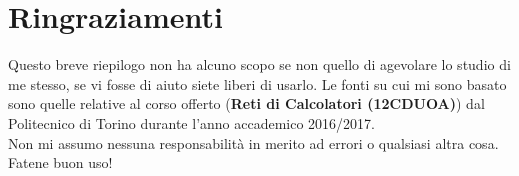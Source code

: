 \documentclass[12pt]{article}
\begin{document}
\section{Ringraziamenti} Questo breve riepilogo non ha alcuno scopo se non quello di agevolare lo studio di me stesso, se vi fosse di aiuto siete liberi di usarlo. Le fonti su cui mi sono basato sono quelle relative al corso offerto (\textbf{Reti di Calcolatori (12CDUOA)}) dal Politecnico di Torino durante l'anno accademico 2016/2017.\\
Non mi assumo nessuna responsabilità in merito ad errori o qualsiasi altra cosa. Fatene buon uso!



\end{document}
